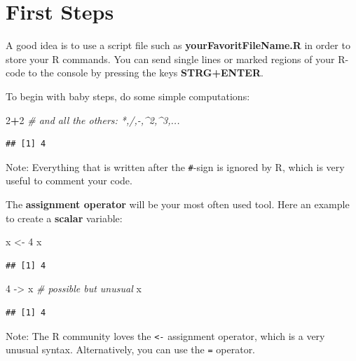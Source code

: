 \documentclass[]{book}
\newenvironment{Shaded}{\begin{snugshade}}{\end{snugshade}}
\newcommand{\CommentTok}[1]{\textcolor[rgb]{0.56,0.35,0.01}{\textit{#1}}}
\newcommand{\DecValTok}[1]{\textcolor[rgb]{0.00,0.00,0.81}{#1}}
\newcommand{\NormalTok}[1]{#1}
\newcommand{\OperatorTok}[1]{\textcolor[rgb]{0.81,0.36,0.00}{\textbf{#1}}}
\newcommand{\StringTok}[1]{\textcolor[rgb]{0.31,0.60,0.02}{#1}}
\theoremstyle{definition}
\theoremstyle{definition}
\theoremstyle{definition}
\theoremstyle{remark}
\begin{document}
\hypertarget{first-steps}{%
\section{First Steps}\label{first-steps}}

A good idea is to use a script file such as \textbf{yourFavoritFileName.R} in order to store your R commands. You can send single lines or marked regions of your R-code to the console by pressing the keys \textbf{STRG+ENTER}.

To begin with baby steps, do some simple computations:

\begin{Shaded}
\begin{Highlighting}[]
\DecValTok{2}\OperatorTok{+}\DecValTok{2} \CommentTok{# and all the others: *,/,-,^2,^3,... }
\end{Highlighting}
\end{Shaded}

\begin{verbatim}
## [1] 4
\end{verbatim}

Note: Everything that is written after the \texttt{\#}-sign is ignored by R, which is very useful to comment your code.

The \textbf{assignment operator} will be your most often used tool. Here an example to create a \textbf{scalar} variable:

\begin{Shaded}
\begin{Highlighting}[]
\NormalTok{x <-}\StringTok{ }\DecValTok{4} 
\NormalTok{x}
\end{Highlighting}
\end{Shaded}

\begin{verbatim}
## [1] 4
\end{verbatim}

\begin{Shaded}
\begin{Highlighting}[]
\DecValTok{4}\NormalTok{ ->}\StringTok{ }\NormalTok{x }\CommentTok{# possible but unusual}
\NormalTok{x}
\end{Highlighting}
\end{Shaded}

\begin{verbatim}
## [1] 4
\end{verbatim}

Note: The R community loves the \texttt{\textless{}-} assignment operator, which is a very unusual syntax. Alternatively, you can use the \texttt{=} operator.
\end{document}
